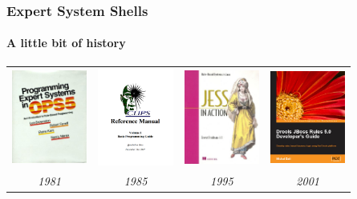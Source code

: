 \documentclass[xcolor={usenames,dvipsnames,svgnames}, compress]{beamer}
\begin{document}
{
  \begin{frame}[t]
    \frametitle{Expert System Shells}
    \framesubtitle{A little bit of history}
    \begin{table}
      \setlength\tabcolsep{2pt}
      \centering
      \begin{tabular}{c c c c}
        \includegraphics[width=70pt]{Figures/ops5} &
        \includegraphics[width=70pt]{Figures/clips-programming} &
        \includegraphics[width=70pt]{Figures/jess}&
        \includegraphics[width=70pt]{Figures/drools}\\
        \emph{1981} & \emph{1985} & \emph{1995}& \emph{2001}
      \end{tabular}
    \end{table}
    
  \end{frame}
}
\end{document}
